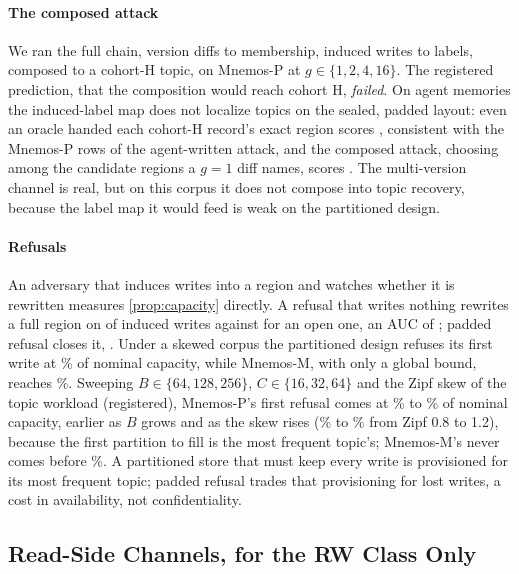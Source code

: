\paragraph{The composed attack}
We ran the full chain, version diffs to membership, induced writes to labels, composed to a cohort-H
topic, on Mnemos-P at $g \in \{1, 2, 4, 16\}$. The registered prediction, that the composition
would reach cohort H, \emph{failed}. On agent memories the induced-label map does not localize
topics on the sealed, padded layout: even an oracle handed each cohort-H record's exact region scores
\REseventeenOracle, consistent with the Mnemos-P rows of the agent-written attack, and the
composed attack,
choosing among the \REseventeenCandOne{} candidate regions a $g=1$ diff names, scores
\REseventeenComposedOne. The multi-version channel is real, but on this corpus it does not compose
into topic recovery, because the label map it would feed is weak on the partitioned design.

\paragraph{Refusals}
An adversary that induces writes into a region and watches whether it is rewritten measures
\cref{prop:capacity} directly. A refusal that writes nothing rewrites a full region on
\REnineSilentFull{} of induced writes against \REnineSilentOpen{} for an open one, an AUC of
\REnineSilentAUC; padded refusal closes it, \REninePaddedAUC. Under a skewed corpus the partitioned
design refuses its first write at \REnineUtilP\% of nominal capacity, while Mnemos-M, with only a
global bound, reaches \REnineUtilM\%. Sweeping $B \in \{64,128,256\}$, $C \in \{16,32,64\}$ and the
Zipf skew of the topic workload (registered), Mnemos-P's first refusal comes at
\REtwentythreePWorst\% to \REtwentythreePBest\% of nominal capacity, earlier as $B$ grows and as the
skew rises (\REtwentythreePSkewLow\% to \REtwentythreePSkewHigh\% from Zipf 0.8 to 1.2), because the
first partition to fill is the most frequent topic's; Mnemos-M's never comes before
\REtwentythreeMWorst\%. A partitioned store that must keep every write is provisioned for its most
frequent topic; padded refusal trades that provisioning for lost writes, a cost in availability,
not confidentiality.

\subsection{Read-Side Channels, for the RW Class Only}
\label{sec:eval-rw}
\label{sec:eval-search}
\label{sec:eval-query}
\label{sec:eval-permutation}

